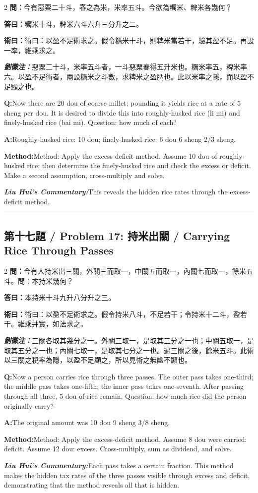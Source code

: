 \documentclass[11pt,a4paper]{article}
\newcommand{\cnwen}{\textcolor{cnlabelfg}{\textbf{問：}}}
\newcommand{\cnda}{\textbf{答曰：}}
\newcommand{\cnshu}{\textcolor{cnlabelfg}{\textbf{術曰：}}}
\newcommand{\cnzhu}{\textcolor{commentarycolor}{\textit{\textbf{劉徽注：}}}}
\newcommand{\enwen}{\textcolor{enlabelfg}{\textbf{Q:}}}
\newcommand{\enda}{\textcolor{enlabelfg}{\textbf{A:}}}
\newcommand{\enshu}{\textcolor{enlabelfg}{\textbf{Method:}}}
\newcommand{\enzhu}{\textcolor{enlabelfg}{\textit{\textbf{Liu Hui's Commentary:}}}}
\begin{document}
\begin{paracol}{2}
\switchcolumn[0]
\cnwen 今有惡粟二十斗，春之為米，米率五斗。今欲為糲米、粺米各幾何？

\cnda 糲米十斗，粺米六斗六升三分升之二。

\cnshu 術曰：以盈不足術求之。假令糲米十斗，則粺米當若干，驗其盈不足。再設一率，維乘求之。

\cnzhu 惡粟二十斗，米率五斗者，一斗惡粟春得五升米也。糲米率五，粺米率六。以盈不足術者，兩設糲米之斗數，求粺米之盈肭也。此以米率之隱，而以盈不足顯之也。

\switchcolumn[1]
\enwen Now there are 20 dou of coarse millet; pounding it yields rice at a rate of 5 sheng per dou. It is desired to divide this into roughly-husked rice (li mi) and finely-husked rice (bai mi). Question: how much of each?

\enda Roughly-husked rice: 10 dou; finely-husked rice: 6 dou 6 sheng 2/3 sheng.

\enshu Method: Apply the excess-deficit method. Assume 10 dou of roughly-husked rice: then determine the finely-husked rice and check the excess or deficit. Make a second assumption, cross-multiply and solve.

\enzhu This reveals the hidden rice rates through the excess-deficit method.
\end{paracol}

\bigskip\hrule\bigskip

\subsection{第十七題 / Problem 17: 持米出關 / Carrying Rice Through Passes}

\begin{paracol}{2}
\switchcolumn[0]
\cnwen 今有人持米出三關，外關三而取一，中關五而取一，內關七而取一，餘米五斗。問：本持米幾何？

\cnda 本持米十斗九升八分升之三。

\cnshu 術曰：以盈不足術求之。假令持米八斗，不足若干；令持米十二斗，盈若干。維乘并實，如法求之。

\cnzhu 三關各取其幾分之一。外關三取一，是取其三分之一也；中關五取一，是取其五分之一也；內關七取一，是取其七分之一也。過三關之後，餘米五斗。此術以三關之稅率為隱，以盈不足顯之，所以見術之無幽不顯也。

\switchcolumn[1]
\enwen Now a person carries rice through three passes. The outer pass takes one-third; the middle pass takes one-fifth; the inner pass takes one-seventh. After passing through all three, 5 dou of rice remain. Question: how much rice did the person originally carry?

\enda The original amount was 10 dou 9 sheng 3/8 sheng.

\enshu Method: Apply the excess-deficit method. Assume 8 dou were carried: deficit. Assume 12 dou: excess. Cross-multiply, sum as dividend, and solve.

\enzhu Each pass takes a certain fraction. This method makes the hidden tax rates of the three passes visible through excess and deficit, demonstrating that the method reveals all that is hidden.
\end{paracol}
\end{document}
